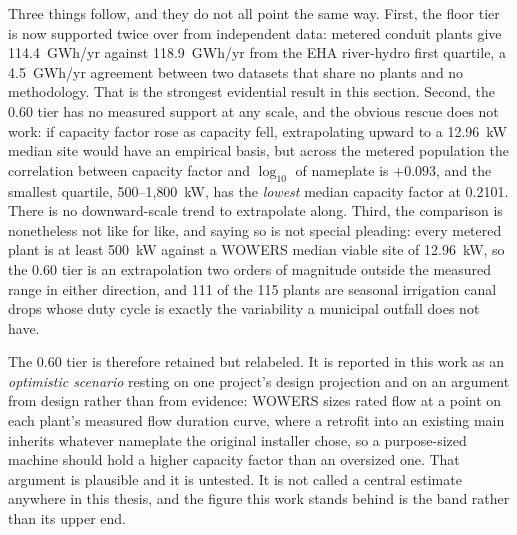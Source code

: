 \documentclass[12pt,letterpaper]{report}
\begin{document}
Three things follow, and they do not all point the same way. First, the floor tier is
now supported twice over from independent data: metered conduit plants give
114.4~GWh/yr against 118.9~GWh/yr from the EHA river-hydro first quartile, a
4.5~GWh/yr agreement between two datasets that share no plants and no methodology.
That is the strongest evidential result in this section. Second, the 0.60 tier has no
measured support at any scale, and the obvious rescue does not work: if capacity factor
rose as capacity fell, extrapolating upward to a 12.96~kW median site would have an
empirical basis, but across the metered population the correlation between capacity
factor and $\log_{10}$ of nameplate is $+0.093$, and the smallest quartile,
500--1{,}800~kW, has the \emph{lowest} median capacity factor at 0.2101. There is no
downward-scale trend to extrapolate along. Third, the comparison is nonetheless not
like for like, and saying so is not special pleading: every metered plant is at least
500~kW against a WOWERS median viable site of 12.96~kW, so the 0.60 tier is an
extrapolation two orders of magnitude outside the measured range in either direction,
and 111 of the 115 plants are seasonal irrigation canal drops whose duty cycle is
exactly the variability a municipal outfall does not have.

The 0.60 tier is therefore retained but relabeled. It is reported in this work as an
\emph{optimistic scenario} resting on one project's design projection and on an
argument from design rather than from evidence: WOWERS sizes rated flow at a point on
each plant's measured flow duration curve, where a retrofit into an existing main
inherits whatever nameplate the original installer chose, so a purpose-sized machine
should hold a higher capacity factor than an oversized one. That argument is plausible
and it is untested. It is not called a central estimate anywhere in this thesis, and
the figure this work stands behind is the band rather than its upper end.
\end{document}
